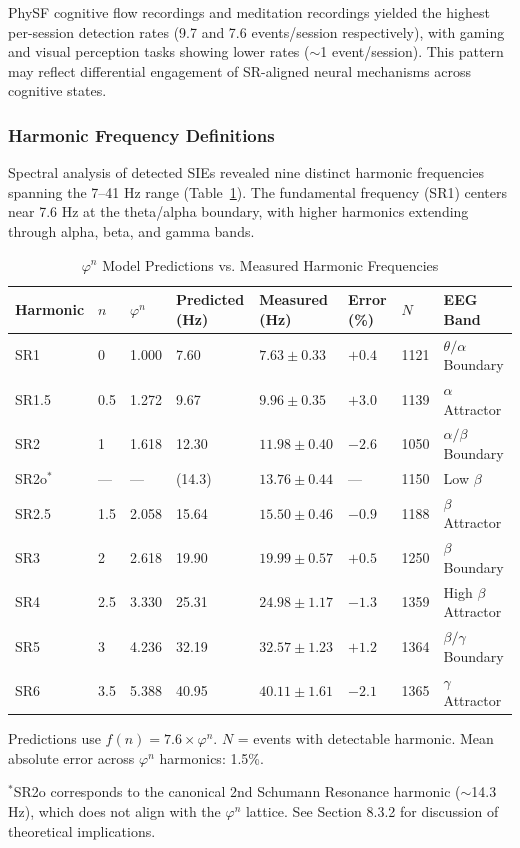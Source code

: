 \documentclass[11pt,a4paper]{article}
\newcommand{\phisym}{\varphi}
\begin{document}
PhySF cognitive flow recordings and meditation recordings yielded the highest per-session detection rates (9.7 and 7.6 events/session respectively), with gaming and visual perception tasks showing lower rates ($\sim$1 event/session). This pattern may reflect differential engagement of SR-aligned neural mechanisms across cognitive states.

\subsubsection{Harmonic Frequency Definitions}
Spectral analysis of detected SIEs revealed nine distinct harmonic frequencies spanning the 7--41 Hz range (Table~\ref{tab:harmonic_definitions}). The fundamental frequency (SR1) centers near 7.6 Hz at the theta/alpha boundary, with higher harmonics extending through alpha, beta, and gamma bands.

\begin{table}[H]
\centering
\caption{$\phisym^n$ Model Predictions vs. Measured Harmonic Frequencies}
\label{tab:harmonic_definitions}
\begin{tabular}{llllllll}
\toprule
Harmonic & $n$ & $\phisym^n$ & Predicted (Hz) & Measured (Hz) & Error (\%) & $N$ & EEG Band \\
\midrule
SR1 & 0 & 1.000 & 7.60 & $7.63 \pm 0.33$ & $+0.4$ & 1121 & $\theta/\alpha$ Boundary \\
SR1.5 & 0.5 & 1.272 & 9.67 & $9.96 \pm 0.35$ & $+3.0$ & 1139 & $\alpha$ Attractor \\
SR2 & 1 & 1.618 & 12.30 & $11.98 \pm 0.40$ & $-2.6$ & 1050 & $\alpha/\beta$ Boundary \\
SR2o$^*$ & --- & --- & (14.3) & $13.76 \pm 0.44$ & --- & 1150 & Low $\beta$ \\
SR2.5 & 1.5 & 2.058 & 15.64 & $15.50 \pm 0.46$ & $-0.9$ & 1188 & $\beta$ Attractor \\
SR3 & 2 & 2.618 & 19.90 & $19.99 \pm 0.57$ & $+0.5$ & 1250 & $\beta$ Boundary \\
SR4 & 2.5 & 3.330 & 25.31 & $24.98 \pm 1.17$ & $-1.3$ & 1359 & High $\beta$ Attractor \\
SR5 & 3 & 4.236 & 32.19 & $32.57 \pm 1.23$ & $+1.2$ & 1364 & $\beta/\gamma$ Boundary \\
SR6 & 3.5 & 5.388 & 40.95 & $40.11 \pm 1.61$ & $-2.1$ & 1365 & $\gamma$ Attractor \\
\bottomrule
\end{tabular}
\begin{tablenotes}
\small
\item Predictions use $f(n) = 7.6 \times \phisym^n$. $N$ = events with detectable harmonic. Mean absolute error across $\phisym^n$ harmonics: 1.5\%.
\item $^*$SR2o corresponds to the canonical 2nd Schumann Resonance harmonic ($\sim$14.3 Hz), which does not align with the $\phisym^n$ lattice. See Section 8.3.2 for discussion of theoretical implications.
\end{tablenotes}
\end{table}
\end{document}
